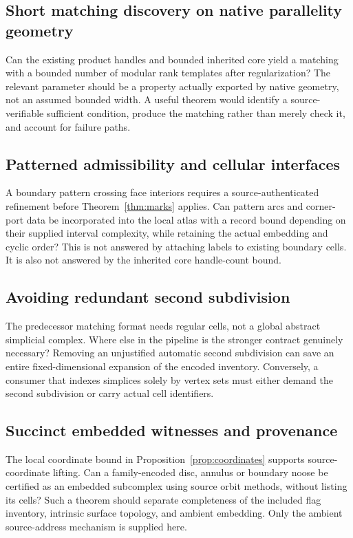 \documentclass[11pt]{article}
\theoremstyle{definition}\newtheorem{definition}[theorem]{Definition}
\theoremstyle{remark}\newtheorem{remark}[theorem]{Remark}
\begin{document}
\subsection{Short matching discovery on native parallelity geometry}
Can the existing product handles and bounded inherited core yield a matching with a bounded number of modular rank templates after regularization? The relevant parameter should be a property actually exported by native geometry, not an assumed bounded width. A useful theorem would identify a source-verifiable sufficient condition, produce the matching rather than merely check it, and account for failure paths.

\subsection{Patterned admissibility and cellular interfaces}
A boundary pattern crossing face interiors requires a source-authenticated refinement before Theorem~\ref{thm:marks} applies. Can pattern arcs and corner-port data be incorporated into the local atlas with a record bound depending on their supplied interval complexity, while retaining the actual embedding and cyclic order? This is not answered by attaching labels to existing boundary cells. It is also not answered by the inherited core handle-count bound.

\subsection{Avoiding redundant second subdivision}
The predecessor matching format needs regular cells, not a global abstract simplicial complex. Where else in the pipeline is the stronger contract genuinely necessary? Removing an unjustified automatic second subdivision can save an entire fixed-dimensional expansion of the encoded inventory. Conversely, a consumer that indexes simplices solely by vertex sets must either demand the second subdivision or carry actual cell identifiers.

\subsection{Succinct embedded witnesses and provenance}
The local coordinate bound in Proposition~\ref{prop:coordinates} supports source-coordinate lifting. Can a family-encoded disc, annulus or boundary noose be certified as an embedded subcomplex using source orbit methods, without listing its cells? Such a theorem should separate completeness of the included flag inventory, intrinsic surface topology, and ambient embedding. Only the ambient source-address mechanism is supplied here.
\end{document}
